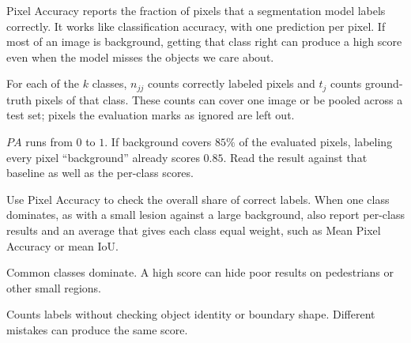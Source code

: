 Pixel Accuracy reports the fraction of pixels that a segmentation model labels correctly. It works like classification accuracy, with one prediction per pixel. If most of an image is background, getting that class right can produce a high score even when the model misses the objects we care about.

\begin{metricformula}
\end{metricformula}

For each of the $k$ classes, $n_{jj}$ counts correctly labeled pixels and $t_j$ counts ground-truth pixels of that class. These counts can cover one image or be pooled across a test set; pixels the evaluation marks as ignored are left out.

$PA$ runs from $0$ to $1$. If background covers $85\%$ of the evaluated pixels, labeling every pixel ``background'' already scores $0.85$. Read the result against that baseline as well as the per-class scores.



Use Pixel Accuracy to check the overall share of correct labels. When one class dominates, as with a small lesion against a large background, also report per-class results and an average that gives each class equal weight, such as Mean Pixel Accuracy or mean IoU.


{
\item Common classes dominate. A high score can hide poor results on pedestrians or other small regions.
\item Counts labels without checking object identity or boundary shape. Different mistakes can produce the same score.
}

\metricsecondpage

